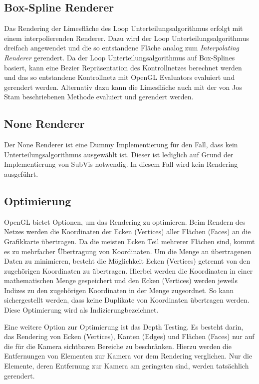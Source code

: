 \subsection{Box-Spline Renderer}
Das Rendering der Limesfläche des Loop Unterteilungsalgorithmus erfolgt mit einem interpolierenden Renderer.
Dazu wird der Loop Unterteilungsalgorithmus dreifach angewendet und die so entstandene Fläche analog zum \textit{Interpolating Renderer} gerendert.
Da der Loop Unterteilungsalgorithmus auf Box-Splines basiert, kann eine Bezier Repräsentation des Kontrollnetzes berechnet werden \cite{prautzsch:2012} und das so entstandene Kontrollnetz mit OpenGL Evaluators evaluiert und gerendert werden.
Alternativ dazu kann die Limesfläche auch mit der von Jos Stam beschriebenen Methode \cite{JosStam.24.07.2015} evaluiert und gerendert werden.

\subsection{None Renderer}
Der None Renderer ist eine Dummy Implementierung für den Fall, dass kein Unterteilungsalgorithmus ausgewählt ist.
Dieser ist lediglich auf Grund der Implementierung von SubVis notwendig. In diesem Fall wird kein Rendering ausgeführt.

\subsection{Optimierung}
OpenGL bietet Optionen, um das Rendering zu optimieren.
Beim Rendern des Netzes werden die Koordinaten der Ecken (Vertices) aller Flächen (Faces) an die Grafikkarte übertragen.
Da die meisten Ecken Teil mehrerer Flächen sind, kommt es zu mehrfacher Übertragung von Koordinaten.
Um die Menge an übertragenen Daten zu minimieren, besteht die Möglichkeit Ecken (Vertices) getrennt von den zugehörigen Koordinaten zu übertragen.
Hierbei werden die Koordinaten in einer mathematischen Menge gespeichert und den Ecken (Vertices) werden jeweils Indizes zu den zugehörigen Koordinaten in der Menge zugeordnet.
So kann sichergestellt werden, dass keine Duplikate von Koordinaten übertragen werden.
Diese Optimierung wird als \glqq Indizierung\grqq bezeichnet.

Eine weitere Option zur Optimierung ist das \glqq Depth Testing\grqq.
Es besteht darin, das Rendering von Ecken (Vertices), Kanten (Edges) und Flächen (Faces) nur auf die für die Kamera sichtbaren Bereiche zu beschränken.
Hierzu werden die Entfernungen von Elementen zur Kamera vor dem Rendering verglichen.
Nur die Elemente, deren Entfernung zur Kamera am geringsten sind, werden tatsächlich gerendert.

